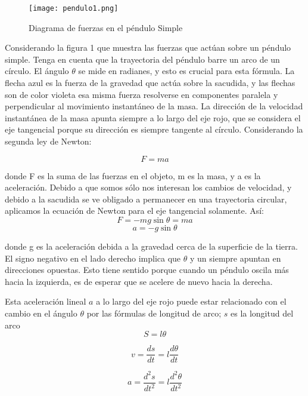 \documentclass[12pt]{article}
\begin{document}
\begin{figure}[H]
\centering
\texttt{[image: pendulo1.png]}
\caption{Diagrama de fuerzas en el péndulo Simple}
\end{figure}
Considerando la figura 1 que muestra las fuerzas que actúan sobre un péndulo simple. Tenga en cuenta que la trayectoria del péndulo barre un arco de un círculo. El ángulo $\theta$ se mide en radianes, y esto es crucial para esta fórmula. La flecha azul es la fuerza de la gravedad que actúa sobre la sacudida, y las flechas son de color violeta esa misma fuerza resolverse en componentes paralela y perpendicular al movimiento instantáneo de la masa. La dirección de la velocidad instantánea de la masa apunta siempre a lo largo del eje rojo, que se considera el eje tangencial porque su dirección es siempre tangente al círculo. Considerando la segunda ley de Newton:

\begin{equation}
F=ma
\end{equation}

donde F es la suma de las fuerzas en el objeto, m es la masa, y a es la aceleración. Debido a que somos sólo nos interesan los cambios de velocidad, y debido a la sacudida se ve obligado a permanecer en una trayectoria circular, aplicamos la ecuación de Newton para el eje tangencial solamente.  Así:
\begin{equation}
F=-m g\sin\theta = ma
\end{equation}
$$a= - g \sin \theta$$

donde g es la aceleración debida a la gravedad cerca de la superficie de la tierra. El signo negativo en el lado derecho implica que $\theta$ y un siempre apuntan en direcciones opuestas. Esto tiene sentido porque cuando un péndulo oscila más hacia la izquierda, es de esperar que se acelere de nuevo hacia la derecha.

Esta aceleración lineal $a$ a lo largo del eje rojo puede estar relacionado con el cambio en el ángulo $\theta$ por las fórmulas de longitud de arco; $s$ es la longitud del arco
\begin{equation}
S=l\theta
\end{equation}

\begin{equation}
v=\frac{ds}{dt} = l\frac{d\theta}{dt}
\end{equation}

\begin{equation}
a=\frac{d^2 s}{dt^2} = l\frac{d^2 \theta}{dt^2}
\end{equation}
\end{document}
